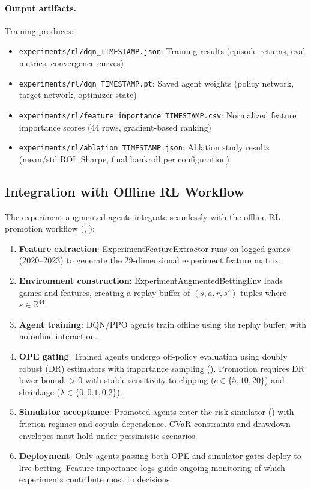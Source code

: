 \paragraph{Output artifacts.}
Training produces:
\begin{itemize}
  \item \texttt{experiments/rl/dqn\_TIMESTAMP.json}: Training results (episode returns, eval metrics, convergence curves)
  \item \texttt{experiments/rl/dqn\_TIMESTAMP.pt}: Saved agent weights (policy network, target network, optimizer state)
  \item \texttt{experiments/rl/feature\_importance\_TIMESTAMP.csv}: Normalized feature importance scores (44 rows, gradient-based ranking)
  \item \texttt{experiments/rl/ablation\_TIMESTAMP.json}: Ablation study results (mean/std ROI, Sharpe, final bankroll per configuration)
\end{itemize}

\subsection{Integration with Offline RL Workflow}

The experiment-augmented agents integrate seamlessly with the offline RL promotion workflow (, ):

\begin{enumerate}
  \item \textbf{Feature extraction}: ExperimentFeatureExtractor runs on logged games (2020--2023) to generate the 29-dimensional experiment feature matrix.
  \item \textbf{Environment construction}: ExperimentAugmentedBettingEnv loads games and features, creating a replay buffer of $(s, a, r, s')$ tuples where $s \in \mathbb{R}^{44}$.
  \item \textbf{Agent training}: DQN/PPO agents train offline using the replay buffer, with no online interaction.
  \item \textbf{OPE gating}: Trained agents undergo off-policy evaluation using doubly robust (DR) estimators with importance sampling (). Promotion requires DR lower bound $> 0$ with stable sensitivity to clipping ($c \in \{5, 10, 20\}$) and shrinkage ($\lambda \in \{0, 0.1, 0.2\}$).
  \item \textbf{Simulator acceptance}: Promoted agents enter the risk simulator () with friction regimes and copula dependence. CVaR constraints and drawdown envelopes must hold under pessimistic scenarios.
  \item \textbf{Deployment}: Only agents passing both OPE and simulator gates deploy to live betting. Feature importance logs guide ongoing monitoring of which experiments contribute most to decisions.
\end{enumerate}

